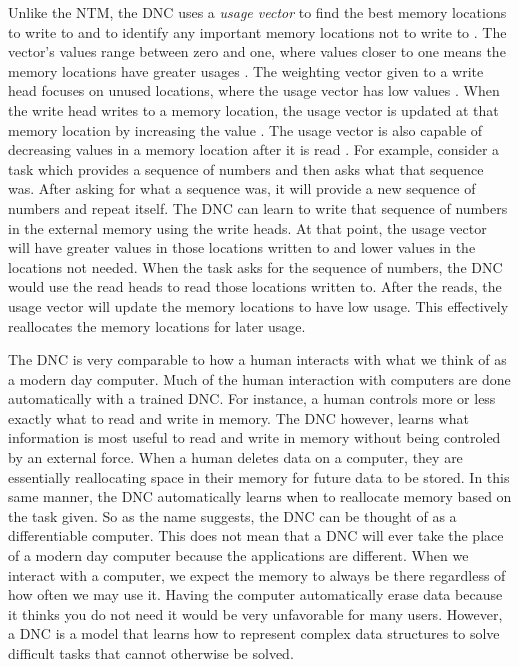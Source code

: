 Unlike the NTM, the DNC uses a \textit{usage vector} to find the best memory
locations to write to and to identify any important memory locations not to
write to \cite{graves2016hybrid}. The vector's values range between zero and
one, where values closer to one means the memory locations have greater usages
\cite{graves2016hybrid}. The weighting vector given to a write head focuses on
unused locations, where the usage vector has low values
\cite{graves2016hybrid}. When the write head writes to a memory location, the
usage vector is updated at that memory location by increasing the value
\cite{graves2016hybrid}. The usage vector is also capable of decreasing values
in a memory location after it is read \cite{graves2016hybrid}. For example,
consider a task which provides a sequence of numbers and then asks what that
sequence was. After asking for what a sequence was, it will provide a new
sequence of numbers and repeat itself. The DNC can learn to write that
sequence of numbers in the external memory using the write heads. At that
point, the usage vector will have greater values in those locations written
to and lower values in the locations not needed. When the task asks for the
sequence of numbers, the DNC would use the read heads to read those locations
written to. After the reads, the usage vector will update the memory locations
to have low usage. This effectively reallocates the memory locations for
later usage.

The DNC is very comparable to how a human interacts with what we think of as
a modern day computer. Much of the human interaction with computers are done
automatically with a trained DNC. For instance, a human controls more or less
exactly what to read and write in memory. The DNC however, learns what
information is most useful to read and write in memory without being controled
by an external force. When a human deletes data on a computer, they are
essentially reallocating space in their memory for future data to be stored.
In this same manner, the DNC automatically learns when to reallocate memory
based on the task given. So as the name suggests, the DNC can be thought of
as a differentiable computer. This does not mean that a DNC will ever take the
place of a modern day computer because the applications are different. When
we interact with a computer, we expect the memory to always be there regardless
of how often we may use it. Having the computer automatically erase data
because it thinks you do not need it would be very unfavorable for many users.
However, a DNC is a model that learns how to represent complex data
structures to solve difficult tasks that cannot otherwise be solved.

